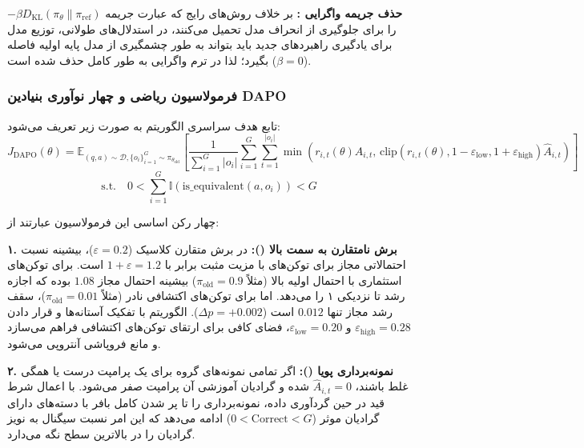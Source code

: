 \textbf{حذف جریمه واگرایی :} بر خلاف روش‌های رایج  که عبارت جریمه $-\beta D_{\text{KL}}(\pi_\theta \parallel \pi_{\text{ref}})$ را برای جلوگیری از انحراف مدل تحمیل می‌کنند، در استدلال‌های طولانی، توزیع مدل برای یادگیری راهبردهای جدید باید بتواند به طور چشمگیری از مدل پایه اولیه فاصله بگیرد؛ لذا در  ترم واگرایی  به طور کامل حذف شده است ($\beta = 0$).

\subsubsection*{فرمولاسیون ریاضی و چهار نوآوری بنیادین DAPO}

تابع هدف سراسری الگوریتم  به صورت زیر تعریف می‌شود:
\begin{equation}
	J_{\text{DAPO}}(\theta) = \mathbb{E}_{(q,a) \sim \mathcal{D}, \{o_i\}_{i=1}^G \sim \pi_{\theta_{\text{old}}}} \left[ \frac{1}{\sum_{i=1}^G |o_i|} \sum_{i=1}^G \sum_{t=1}^{|o_i|} \min \left( r_{i,t}(\theta)\hat{A}_{i,t}, \, \text{clip}\left(r_{i,t}(\theta), 1-\varepsilon_{\text{low}}, 1+\varepsilon_{\text{high}}\right)\hat{A}_{i,t} \right) \right]
\end{equation}
\begin{equation}
	\text{s.t.} \quad 0 < \sum_{i=1}^G \mathbb{I}(\text{is\_equivalent}(a, o_i)) < G
\end{equation}

چهار رکن اساسی این فرمولاسیون عبارتند از:

\textbf{۱. برش نامتقارن به سمت بالا ():}
در برش متقارن کلاسیک ($\varepsilon = 0.2$)، بیشینه نسبت احتمالاتی مجاز برای توکن‌های با مزیت مثبت برابر با $1+\varepsilon = 1.2$ است. برای توکن‌های استثماری با احتمال اولیه بالا (مثلاً $\pi_{\text{old}} = 0.9$) بیشینه احتمال مجاز $1.08$ بوده که اجازه رشد تا نزدیکی ۱ را می‌دهد. اما برای توکن‌های اکتشافی نادر (مثلاً $\pi_{\text{old}} = 0.01$)، سقف رشد مجاز تنها $0.012$ است ($\Delta p = +0.002$). الگوریتم  با تفکیک آستانه‌ها و قرار دادن $\varepsilon_{\text{high}} = 0.28$ و $\varepsilon_{\text{low}} = 0.20$، فضای کافی برای ارتقای توکن‌های اکتشافی فراهم می‌سازد و مانع فروپاشی آنتروپی می‌شود.

\textbf{۲. نمونه‌برداری پویا ():}
اگر تمامی نمونه‌های گروه برای یک پرامپت درست یا همگی غلط باشند، $\hat{A}_{i,t} = 0$ شده و گرادیان آموزشی آن پرامپت صفر می‌شود.  با اعمال شرط قید در حین گردآوری داده، نمونه‌برداری را تا پر شدن کامل بافر با دسته‌های دارای گرادیان موثر ($0 < \text{Correct} < G$) ادامه می‌دهد که این امر نسبت سیگنال به نویز گرادیان را در بالاترین سطح نگه می‌دارد.

